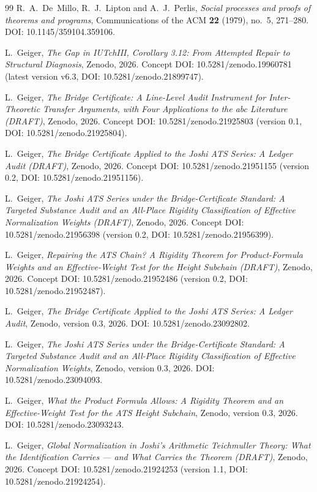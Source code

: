 \documentclass[11pt,a4paper]{article}
\begin{document}
\begin{thebibliography}{99}
R.~A.~De~Millo, R.~J.~Lipton and A.~J.~Perlis,
\emph{Social processes and proofs of theorems and programs},
Communications of the ACM \textbf{22} (1979), no.~5, 271--280.
DOI: 10.1145/359104.359106.

L.~Geiger,
\emph{The Gap in IUTchIII, Corollary 3.12: From Attempted Repair to
Structural Diagnosis},
Zenodo, 2026.
Concept DOI: 10.5281/zenodo.19960781
(latest version v6.3, DOI: 10.5281/zenodo.21899747).

L.~Geiger,
\emph{The Bridge Certificate: A Line-Level Audit Instrument for
Inter-Theoretic Transfer Arguments, with Four Applications to the abc
Literature (DRAFT)},
Zenodo, 2026.
Concept DOI: 10.5281/zenodo.21925803
(version 0.1, DOI: 10.5281/zenodo.21925804).

L.~Geiger,
\emph{The Bridge Certificate Applied to the Joshi ATS Series:
A Ledger Audit (DRAFT)},
Zenodo, 2026.
Concept DOI: 10.5281/zenodo.21951155
(version 0.2, DOI: 10.5281/zenodo.21951156).

L.~Geiger,
\emph{The Joshi ATS Series under the Bridge-Certificate Standard:
A Targeted Substance Audit and an All-Place Rigidity Classification of
Effective Normalization Weights (DRAFT)},
Zenodo, 2026.
Concept DOI: 10.5281/zenodo.21956398
(version 0.2, DOI: 10.5281/zenodo.21956399).

L.~Geiger,
\emph{Repairing the ATS Chain? A Rigidity Theorem for Product-Formula
Weights and an Effective-Weight Test for the Height Subchain (DRAFT)},
Zenodo, 2026.
Concept DOI: 10.5281/zenodo.21952486
(version 0.2, DOI: 10.5281/zenodo.21952487).

L.~Geiger,
\emph{The Bridge Certificate Applied to the Joshi ATS Series: A Ledger Audit},
Zenodo, version 0.3, 2026. DOI: 10.5281/zenodo.23092802.

L.~Geiger,
\emph{The Joshi ATS Series under the Bridge-Certificate Standard:
A Targeted Substance Audit and an All-Place Rigidity Classification
of Effective Normalization Weights},
Zenodo, version 0.3, 2026. DOI: 10.5281/zenodo.23094093.

L.~Geiger,
\emph{What the Product Formula Allows: A Rigidity Theorem and
an Effective-Weight Test for the ATS Height Subchain},
Zenodo, version 0.3, 2026. DOI: 10.5281/zenodo.23093243.

L.~Geiger,
\emph{Global Normalization in Joshi's Arithmetic Teichmuller Theory:
What the Identification Carries --- and What Carries the Theorem
(DRAFT)},
Zenodo, 2026.
Concept DOI: 10.5281/zenodo.21924253
(version 1.1, DOI: 10.5281/zenodo.21924254).


\end{thebibliography}
\end{document}

